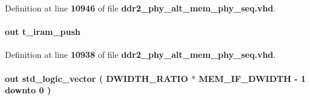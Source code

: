 Definition at line {\bf 10946} of file {\bf ddr2\+\_\+phy\+\_\+alt\+\_\+mem\+\_\+phy\+\_\+seq.\+vhd}.

\paragraph[{dgwb\+\_\+iram}]{ {\bfseries \textcolor{keywordflow}{out}\textcolor{vhdlchar}{ }} {\bfseries {\bfseries {\bf t\+\_\+iram\+\_\+push}} \textcolor{vhdlchar}{ }} \hspace{0.3cm}{\ttfamily [Port]}}\label{classddr2__phy__alt__mem__phy__dgwb_a9b7685754067dd9975863e9b753fb63d}


Definition at line {\bf 10938} of file {\bf ddr2\+\_\+phy\+\_\+alt\+\_\+mem\+\_\+phy\+\_\+seq.\+vhd}.

\paragraph[{dgwb\+\_\+wdata}]{ {\bfseries \textcolor{keywordflow}{out}\textcolor{vhdlchar}{ }} {\bfseries \textcolor{comment}{std\+\_\+logic\+\_\+vector}\textcolor{vhdlchar}{ }\textcolor{vhdlchar}{(}\textcolor{vhdlchar}{ }\textcolor{vhdlchar}{ }\textcolor{vhdlchar}{ }\textcolor{vhdlchar}{ }{\bfseries {\bf D\+W\+I\+D\+T\+H\+\_\+\+R\+A\+T\+IO}} \textcolor{vhdlchar}{$\ast$}\textcolor{vhdlchar}{ }\textcolor{vhdlchar}{ }\textcolor{vhdlchar}{ }{\bfseries {\bf M\+E\+M\+\_\+\+I\+F\+\_\+\+D\+W\+I\+D\+TH}} \textcolor{vhdlchar}{-\/}\textcolor{vhdlchar}{ } \textcolor{vhdldigit}{1} \textcolor{vhdlchar}{ }\textcolor{keywordflow}{downto}\textcolor{vhdlchar}{ }\textcolor{vhdlchar}{ } \textcolor{vhdldigit}{0} \textcolor{vhdlchar}{ }\textcolor{vhdlchar}{)}\textcolor{vhdlchar}{ }} \hspace{0.3cm}{\ttfamily [Port]}}\label{classddr2__phy__alt__mem__phy__dgwb_a2966cb0a10e4dc04cffb7bbc9a55935e}


